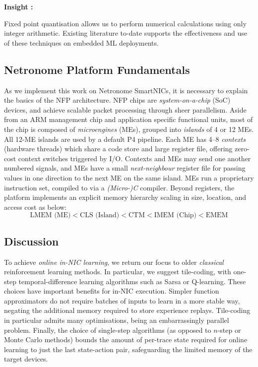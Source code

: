\documentclass[sigconf,natbib=false]{acmart}
\newcounter{insightc}
\newenvironment{insight}
	{
		\begin{tipblock}\refstepcounter{insightc}\textbf{Insight \theinsightc:}\em
	}
	{
		\end{tipblock}
	}
\begin{document}
\begin{insight}
	Fixed point quantisation allows us to perform numerical calculations using only integer arithmetic.
	Existing literature to-date supports the effectiveness and use of these techniques on embedded ML deployments.
\end{insight}

\subsection{Netronome Platform Fundamentals}
As we implement this work on Netronome SmartNICs, it is necessary to explain the basics of the NFP architecture.
NFP chips are \emph{system-on-a-chip} (SoC) devices, and achieve scalable packet processing through sheer parallelism.
Aside from an ARM management chip and application specific functional units, most of the chip is composed of \emph{microengines} (MEs), grouped into \emph{islands} of 4 or 12 MEs.
All 12-ME islands are used by a default P4 pipeline.
Each ME has \numrange{4}{8} \emph{contexts} (hardware threads) which share a code store and large register file, offering zero-cost context switches triggered by I/O.
Contexts and MEs may send one another numbered signals, and MEs have a small \emph{next-neighbour} register file for passing values in one direction to the next ME on the same island.
MEs run a proprietary instruction set, compiled to via a \emph{(Micro-)C} compiler.
Beyond registers, the platform implements an explicit memory hierarchy scaling in size, location, and access cost as below:
$$\text{LMEM (ME)} < \text{CLS (Island)} < \text{CTM} < \text{IMEM (Chip)} < \text{EMEM}$$

\subsection{Discussion}

To achieve \emph{online in-NIC learning}, we return our focus to older \emph{classical} reinforcement learning methods.
In particular, we suggest tile-coding, with one-step temporal-difference learning algorithms such as Sarsa or Q-learning.
These choices have important benefits for in-NIC execution.
Simpler function approximators do not require batches of inputs to learn in a more stable way, negating the additional memory required to store experience replays.
Tile-coding in particular admits many optimisations, being an embarrassingly parallel problem.
Finally, the choice of single-step algorithms (as opposed to $n$-step or Monte Carlo methods) bounds the amount of per-trace state required for online learning to just the last state-action pair, safeguarding the limited memory of the target devices.
\end{document}
